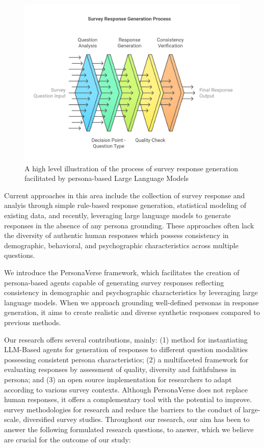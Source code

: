 \documentclass[11pt]{article}
\begin{document}
\begin{figure}
    \centering
    \includegraphics[width=1\linewidth]{latex//assets/PersonaVerse Response Generation Pipeline.png}
    \caption{A high level illustration of the process of survey response generation facilitated by persona-based Large Language Models}
    
\end{figure}

Current approaches in this area include the collection of survey response and analyis through simple rule-based response generation, statistical modeling of existing data, and recently, leveraging large language models to generate responses in the absence of any persona grounding. These approaches often lack the diversity of authentic human responses which possess consistency in demographic, behavioral, and psychographic characteristics across multiple questions.

We introduce the PersonaVerse framework, which facilitates the creation of persona-based agents capable of generating survey responses reflecting consistency in demographic and psychographic characteristics by leveraging large language models. When we approach grounding well-defined personas in response generation, it aims to create realistic and diverse synthetic responses compared to previous methods.

Our research offers several contributions, mainly: (1) method for instantiating LLM-Based agents for generation of responses to different question modalities possessing consistent persona characteristics; (2) a multifaceted framework for evaluating responses by assessment of quality, diversity and faithfulness in persona; and (3) an open source implementation for researchers to adapt according to various survey contexts. Although PersonaVerse does not replace human responses, it offers a complementary tool with the potential to improve. survey methodologies for research and reduce the barriers to the conduct of large-scale, diversified survey studies. Throughout our research, our aim has been to answer the following formulated research questions, to answer, which we believe are crucial for the outcome of our study:
\end{document}
